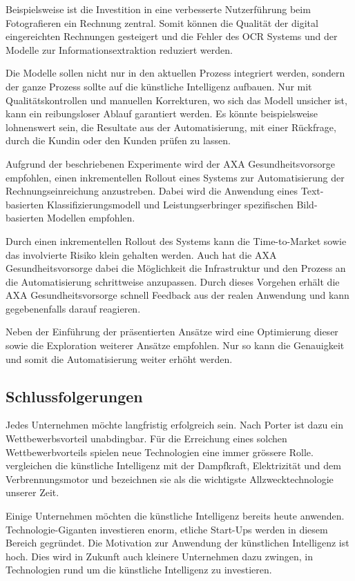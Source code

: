 Beispielsweise ist die Investition in eine verbesserte Nutzerführung beim Fotografieren ein Rechnung zentral. Somit können die Qualität der digital eingereichten Rechnungen gesteigert und die Fehler des OCR Systems und der Modelle zur Informationsextraktion reduziert werden.

Die Modelle sollen nicht nur in den aktuellen Prozess integriert werden, sondern der ganze Prozess sollte auf die künstliche Intelligenz aufbauen. Nur mit Qualitätskontrollen und manuellen Korrekturen, wo sich das Modell unsicher ist, kann ein reibungsloser Ablauf garantiert werden. Es könnte beispielsweise lohnenswert sein, die Resultate aus der Automatisierung, mit einer Rückfrage, durch die Kundin oder den Kunden prüfen zu lassen.

Aufgrund der beschriebenen Experimente wird der AXA Gesundheitsvorsorge empfohlen, einen inkrementellen Rollout eines Systems zur Automatisierung der Rechnungseinreichung anzustreben. Dabei wird die Anwendung eines Text-basierten Klassifizierungsmodell und Leistungserbringer spezifischen Bild-basierten Modellen empfohlen.

Durch einen inkrementellen Rollout des Systems kann die Time-to-Market sowie das involvierte Risiko klein gehalten werden. Auch hat die AXA Gesundheitsvorsorge dabei die Möglichkeit die Infrastruktur und den Prozess an die Automatisierung schrittweise anzupassen. Durch dieses Vorgehen erhält die AXA Gesundheitsvorsorge schnell Feedback aus der realen Anwendung und kann gegebenenfalls darauf reagieren.

Neben der Einführung der präsentierten Ansätze wird eine Optimierung dieser sowie die Exploration weiterer Ansätze empfohlen. Nur so kann die Genauigkeit und somit die Automatisierung weiter erhöht werden.

\subsection{Schlussfolgerungen}

Jedes Unternehmen möchte langfristig erfolgreich sein. Nach Porter ist dazu ein Wettbewerbsvorteil unabdingbar. Für die Erreichung eines solchen Wettbewerbvorteils spielen neue Technologien eine immer grössere Rolle. \textcite{McAfee} vergleichen die künstliche Intelligenz mit der Dampfkraft, Elektrizität und dem Verbrennungsmotor und bezeichnen sie als die wichtigste Allzwecktechnologie unserer Zeit.

Einige Unternehmen möchten die künstliche Intelligenz bereits heute anwenden. Technologie-Giganten investieren enorm, etliche Start-Ups werden in diesem Bereich gegründet. Die Motivation zur Anwendung der künstlichen Intelligenz ist hoch. Dies wird in Zukunft auch kleinere Unternehmen dazu zwingen, in Technologien rund um die künstliche Intelligenz zu investieren.


